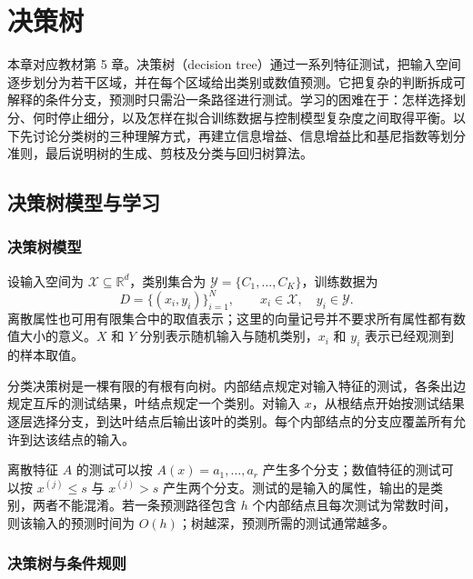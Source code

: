 \setcounter{chapter}{4} %
\chapter{决策树}
\label{ch:lihang-decision-tree}

本章对应教材第 5 章。决策树（decision tree）通过一系列特征测试，把输入空间逐步划分为若干区域，并在每个区域给出类别或数值预测。它把复杂的判断拆成可解释的条件分支，预测时只需沿一条路径进行测试。学习的困难在于：怎样选择划分、何时停止细分，以及怎样在拟合训练数据与控制模型复杂度之间取得平衡。以下先讨论分类树的三种理解方式，再建立信息增益、信息增益比和基尼指数等划分准则，最后说明树的生成、剪枝及分类与回归树算法。

\section{决策树模型与学习}
\label{sec:lihang-tree-model}

\subsection{决策树模型}

设输入空间为 $\mathcal X\subseteq\mathbb R^d$，类别集合为 $\mathcal Y=\{C_1,\ldots,C_K\}$，训练数据为
\[
  D=\{(x_i,y_i)\}_{i=1}^N,\qquad x_i\in\mathcal X,\quad y_i\in\mathcal Y.
\]
离散属性也可用有限集合中的取值表示；这里的向量记号并不要求所有属性都有数值大小的意义。$X$ 和 $Y$ 分别表示随机输入与随机类别，$x_i$ 和 $y_i$ 表示已经观测到的样本取值。

\begin{definition}[分类决策树]
分类决策树是一棵有限的有根有向树。内部结点规定对输入特征的测试，各条出边规定互斥的测试结果，叶结点规定一个类别。对输入 $x$，从根结点开始按测试结果逐层选择分支，到达叶结点后输出该叶的类别。每个内部结点的分支应覆盖所有允许到达该结点的输入。
\end{definition}

离散特征 $A$ 的测试可以按 $A(x)=a_1,\ldots,a_r$ 产生多个分支；数值特征的测试可以按 $x^{(j)}\leq s$ 与 $x^{(j)}>s$ 产生两个分支。测试的是输入的属性，输出的是类别，两者不能混淆。若一条预测路径包含 $h$ 个内部结点且每次测试为常数时间，则该输入的预测时间为 $O(h)$；树越深，预测所需的测试通常越多。

\subsection{决策树与条件规则}

